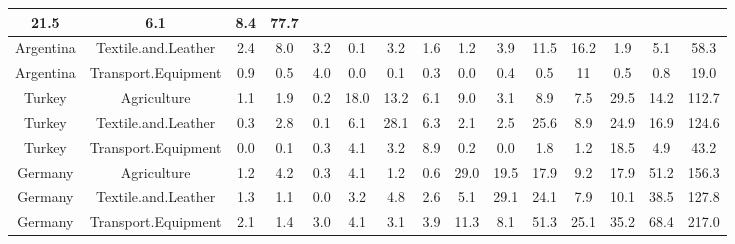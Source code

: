 \documentclass[a4paper]{article}\usepackage[]{graphicx}\usepackage[]{color}
\providecommand{\tabularnewline}{\\}
\begin{document}
\begin{sidewaystable}
\begin{tabular}{|c|c|c|c|c|c|c|c|c|c|c|c|c|c|c|}
{\scriptsize{}21.5 } &
{\scriptsize{}6.1 } &
{\scriptsize{}8.4 } &
{\scriptsize{}77.7 }\tabularnewline
\hline 
{\scriptsize{}Argentina } &
{\scriptsize{}Textile.and.Leather } &
{\scriptsize{}2.4 } &
{\scriptsize{}8.0 } &
{\scriptsize{}3.2 } &
{\scriptsize{}0.1 } &
{\scriptsize{}3.2 } &
{\scriptsize{}1.6 } &
{\scriptsize{}1.2 } &
{\scriptsize{}3.9 } &
{\scriptsize{}11.5 } &
{\scriptsize{}16.2 } &
{\scriptsize{}1.9 } &
{\scriptsize{}5.1 } &
{\scriptsize{}58.3 }\tabularnewline
\hline 
{\scriptsize{}Argentina } &
{\scriptsize{}Transport.Equipment } &
{\scriptsize{}0.9 } &
{\scriptsize{}0.5 } &
{\scriptsize{}4.0 } &
{\scriptsize{}0.0 } &
{\scriptsize{}0.1 } &
{\scriptsize{}0.3 } &
{\scriptsize{}0.0 } &
{\scriptsize{}0.4 } &
{\scriptsize{}0.5 } &
{\scriptsize{}11 } &
{\scriptsize{}0.5 } &
{\scriptsize{}0.8 } &
{\scriptsize{}19.0 }\tabularnewline
\hline 
{\scriptsize{}Turkey } &
{\scriptsize{}Agriculture } &
{\scriptsize{}1.1 } &
{\scriptsize{}1.9 } &
{\scriptsize{}0.2 } &
{\scriptsize{}18.0 } &
{\scriptsize{}13.2 } &
{\scriptsize{}6.1 } &
{\scriptsize{}9.0 } &
{\scriptsize{}3.1 } &
{\scriptsize{}8.9 } &
{\scriptsize{}7.5 } &
{\scriptsize{}29.5 } &
{\scriptsize{}14.2 } &
{\scriptsize{}112.7 }\tabularnewline
\hline 
{\scriptsize{}Turkey } &
{\scriptsize{}Textile.and.Leather } &
{\scriptsize{}0.3 } &
{\scriptsize{}2.8 } &
{\scriptsize{}0.1 } &
{\scriptsize{}6.1 } &
{\scriptsize{}28.1 } &
{\scriptsize{}6.3 } &
{\scriptsize{}2.1 } &
{\scriptsize{}2.5 } &
{\scriptsize{}25.6 } &
{\scriptsize{}8.9 } &
{\scriptsize{}24.9 } &
{\scriptsize{}16.9 } &
{\scriptsize{}124.6 }\tabularnewline
\hline 
{\scriptsize{}Turkey } &
{\scriptsize{}Transport.Equipment } &
{\scriptsize{}0.0 } &
{\scriptsize{}0.1 } &
{\scriptsize{}0.3 } &
{\scriptsize{}4.1 } &
{\scriptsize{}3.2 } &
{\scriptsize{}8.9 } &
{\scriptsize{}0.2 } &
{\scriptsize{}0.0 } &
{\scriptsize{}1.8 } &
{\scriptsize{}1.2 } &
{\scriptsize{}18.5 } &
{\scriptsize{}4.9 } &
{\scriptsize{}43.2 }\tabularnewline
\hline 
{\scriptsize{}Germany } &
{\scriptsize{}Agriculture } &
{\scriptsize{}1.2 } &
{\scriptsize{}4.2 } &
{\scriptsize{}0.3 } &
{\scriptsize{}4.1 } &
{\scriptsize{}1.2 } &
{\scriptsize{}0.6 } &
{\scriptsize{}29.0 } &
{\scriptsize{}19.5 } &
{\scriptsize{}17.9 } &
{\scriptsize{}9.2 } &
{\scriptsize{}17.9 } &
{\scriptsize{}51.2 } &
{\scriptsize{}156.3 }\tabularnewline
\hline 
{\scriptsize{}Germany } &
{\scriptsize{}Textile.and.Leather } &
{\scriptsize{}1.3 } &
{\scriptsize{}1.1 } &
{\scriptsize{}0.0 } &
{\scriptsize{}3.2 } &
{\scriptsize{}4.8 } &
{\scriptsize{}2.6 } &
{\scriptsize{}5.1 } &
{\scriptsize{}29.1 } &
{\scriptsize{}24.1 } &
{\scriptsize{}7.9 } &
{\scriptsize{}10.1 } &
{\scriptsize{}38.5 } &
{\scriptsize{}127.8 }\tabularnewline
\hline 
{\scriptsize{}Germany } &
{\scriptsize{}Transport.Equipment } &
{\scriptsize{}2.1 } &
{\scriptsize{}1.4 } &
{\scriptsize{}3.0 } &
{\scriptsize{}4.1 } &
{\scriptsize{}3.1 } &
{\scriptsize{}3.9 } &
{\scriptsize{}11.3 } &
{\scriptsize{}8.1 } &
{\scriptsize{}51.3 } &
{\scriptsize{}25.1 } &
{\scriptsize{}35.2 } &
{\scriptsize{}68.4 } &
{\scriptsize{}217.0 }\tabularnewline
\hline 
\end{tabular}
\end{sidewaystable}
\end{document}

